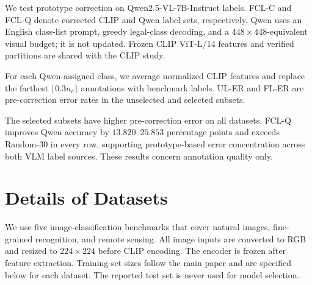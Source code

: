 \documentclass[10pt,twocolumn,letterpaper]{article}
\begin{document}
We test prototype correction on Qwen2.5-VL-7B-Instruct labels. FCL-C and
FCL-Q denote corrected CLIP and Qwen label sets, respectively. Qwen uses an
English class-list prompt, greedy legal-class decoding, and a
$448\times448$-equivalent visual budget; it is not updated. Frozen CLIP
ViT-L/14 features and verified partitions are shared with the CLIP study.

For each Qwen-assigned class, we average normalized CLIP features and
replace the farthest $\lceil0.3n_c\rceil$ annotations with benchmark labels.
UL-ER and FL-ER are pre-correction error rates in the unselected and
selected subsets.

The selected subsets have higher pre-correction error on all datasets. FCL-Q
improves Qwen accuracy by $13.820$--$25.853$ percentage points and exceeds
Random-30 in every row, supporting prototype-based error concentration across both VLM label sources. These results concern annotation quality only.


\section{Details of Datasets}
We use five image-classification benchmarks that cover natural images,
fine-grained recognition, and remote sensing. All image
inputs are converted to RGB and resized to $224\times224$ before CLIP
encoding. The encoder is frozen after feature extraction. Training-set sizes
follow the main paper and are specified below for each dataset. The reported
test set is never used for model selection.
\end{document}
